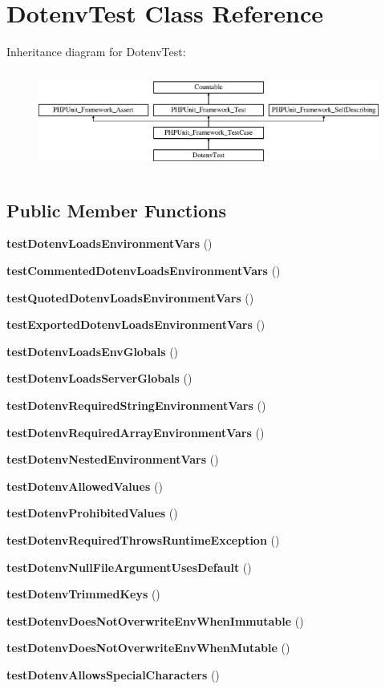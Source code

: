 \section{Dotenv\+Test Class Reference}
\label{class_dotenv_test}
Inheritance diagram for Dotenv\+Test\+:\begin{figure}[H]
\begin{center}
\leavevmode
\includegraphics[height=3.303835cm]{class_dotenv_test}
\end{center}
\end{figure}
\subsection*{Public Member Functions}
\begin{DoxyCompactItemize}
\item 
{\bf test\+Dotenv\+Loads\+Environment\+Vars} ()
\item 
{\bf test\+Commented\+Dotenv\+Loads\+Environment\+Vars} ()
\item 
{\bf test\+Quoted\+Dotenv\+Loads\+Environment\+Vars} ()
\item 
{\bf test\+Exported\+Dotenv\+Loads\+Environment\+Vars} ()
\item 
{\bf test\+Dotenv\+Loads\+Env\+Globals} ()
\item 
{\bf test\+Dotenv\+Loads\+Server\+Globals} ()
\item 
{\bf test\+Dotenv\+Required\+String\+Environment\+Vars} ()
\item 
{\bf test\+Dotenv\+Required\+Array\+Environment\+Vars} ()
\item 
{\bf test\+Dotenv\+Nested\+Environment\+Vars} ()
\item 
{\bf test\+Dotenv\+Allowed\+Values} ()
\item 
{\bf test\+Dotenv\+Prohibited\+Values} ()
\item 
{\bf test\+Dotenv\+Required\+Throws\+Runtime\+Exception} ()
\item 
{\bf test\+Dotenv\+Null\+File\+Argument\+Uses\+Default} ()
\item 
{\bf test\+Dotenv\+Trimmed\+Keys} ()
\item 
{\bf test\+Dotenv\+Does\+Not\+Overwrite\+Env\+When\+Immutable} ()
\item 
{\bf test\+Dotenv\+Does\+Not\+Overwrite\+Env\+When\+Mutable} ()
\item 
{\bf test\+Dotenv\+Allows\+Special\+Characters} ()
\end{DoxyCompactItemize}
